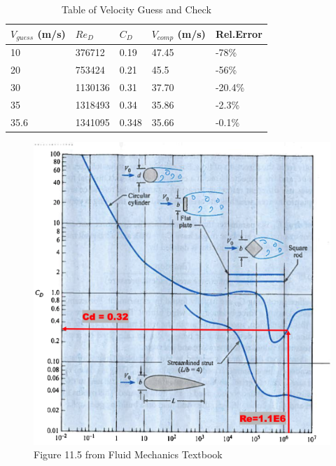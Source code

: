 \documentclass[12pt]{article}
\begin{document}
\begin{table}[h!]
   \centering

      \caption{Table of Velocity Guess and Check}
     \begin{tabular}{p{1in}p{1in}p{1in}p{1in}p{1in}}
     $V_{guess}$ (m/s) & $Re_D$ & $C_D$ & $V_{comp}$ (m/s) & Rel.Error\\ 
     \hline
     \hline
     10&376712&0.19&47.45&-78\%\\
      20&753424&0.21&45.5&-56\%\\
      30&1130136&0.31&37.70&-20.4\%\\
      35& 1318493&0.34&35.86&-2.3\%\\
      35.6& 1341095&0.348& 35.66&-0.1\%\\
     \hline
   \end{tabular}

   \label{tab:booktabs}
\end{table}

\begin{figure}[h!] %
   \centering
   \includegraphics[width=5in]{Fig11-5.pdf} 
   \caption{Figure 11.5 from Fluid Mechanics Textbook}
   \label{fig:Fig11.5}
\end{figure}
\end{document}
